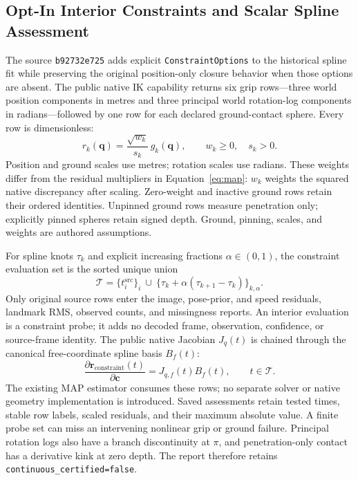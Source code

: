 \documentclass[11pt,letterpaper]{article}
\newcommand{\code}[1]{\nolinkurl{#1}}
\begin{document}
\subsection{Opt-In Interior Constraints and Scalar Spline Assessment}
The source \code{b92732e725} adds explicit \code{ConstraintOptions} to the
historical spline fit while preserving the original position-only closure
behavior when those options are absent. The public native IK capability
returns six grip rows---three world position components in metres and three
principal world rotation-log components in radians---followed by one row for
each declared ground-contact sphere. Every row is dimensionless:
\begin{equation}
 r_k(\mathbf q)=\frac{\sqrt{w_k}}{s_k}\,g_k(\mathbf q),
 \qquad w_k\geq0,\quad s_k>0.
\end{equation}
Position and ground scales use metres; rotation scales use radians. These
weights differ from the residual multipliers in Equation~\ref{eq:map}:
$w_k$ weights the squared native discrepancy after scaling. Zero-weight and
inactive ground rows retain their ordered identities. Unpinned ground rows
measure penetration only; explicitly pinned spheres retain signed depth.
Ground, pinning, scales, and weights are authored assumptions.

For spline knots $\tau_k$ and explicit increasing fractions
$\alpha\in(0,1)$, the constraint evaluation set is the sorted unique union
\begin{equation}
 \mathcal T=\{t_i^{\mathrm{src}}\}_i\ \cup\
 \{\tau_k+\alpha(\tau_{k+1}-\tau_k)\}_{k,\alpha}.
\end{equation}
Only original source rows enter the image, pose-prior, and speed residuals,
landmark RMS, observed counts, and missingness reports. An interior evaluation
is a constraint probe; it adds no decoded frame, observation, confidence,
or source-frame identity. The public native Jacobian $J_q(t)$ is chained
through the canonical free-coordinate spline basis $B_f(t)$:
\begin{equation}
 \frac{\partial\mathbf r_{\mathrm{constraint}}(t)}{\partial\mathbf c}
 =J_{q,f}(t)B_f(t),\qquad t\in\mathcal T.
\end{equation}
The existing MAP estimator consumes these rows; no separate solver or native
geometry implementation is introduced. Saved assessments retain tested times,
stable row labels, scaled residuals, and their maximum absolute value. A finite
probe set can miss an intervening nonlinear grip or ground failure. Principal
rotation logs also have a branch discontinuity at $\pi$, and penetration-only
contact has a derivative kink at zero depth. The report therefore retains
\code{continuous_certified=false}.
\end{document}
